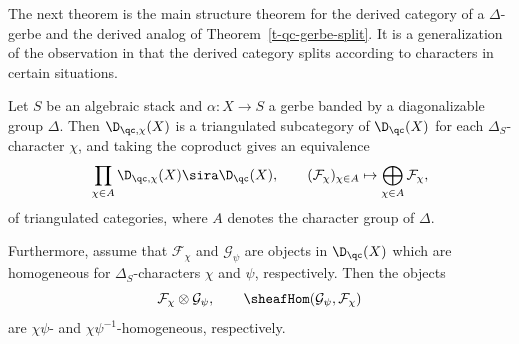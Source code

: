The next theorem is the main structure theorem for the derived
category of a $\Delta$-gerbe and the derived analog of Theorem~\ref{t-qc-gerbe-split}.
It is a generalization of the observation in \cite[Section~2.2.4]{lieblich2004}
that the derived category splits according to characters in certain situations.
\begin{theorem}
  \label{t:chi-splitting-D-qc-X}
  Let $S$ be an algebraic stack and 
  $\alpha\colon X \to S$ a gerbe banded by a diagonalizable group
  $\Delta$.
  Then $\D_{\qc, \chi}(X)$ is
  a triangulated subcategory of $\D_{\qc}(X)$ for each $\Delta_S$-character $\chi$,
  and taking the coproduct gives an equivalence
\begin{equation}
\label{eq-equivalence-derived}
\prod_{\chi \in A} \D_{\qc, \chi}(X) \sira \D_\qc(X),
\qquad
 (\mathcal{F}_\chi)_{\chi \in A} 
\mapsto 
\bigoplus_{\chi \in A} \mathcal{F}_\chi,
\end{equation}
of triangulated categories, where $A$ denotes the character group of $\Delta$.

Furthermore, assume that $\mathcal{F}_\chi$ and $\mathcal{G}_\psi$ are objects in $\D_\qc(X)$
which are homogeneous for $\Delta_S$-characters $\chi$ and $\psi$, respectively.
Then the objects
\begin{equation}
\label{eq-der-monoidal}
\mathcal{F}_\chi \otimes \mathcal{G}_\psi, \qquad
\sheafHom(\mathcal{G}_\psi, \mathcal{F}_\chi)
\end{equation}
are $\chi\psi$- and $\chi\psi^{-1}$-homogeneous, respectively.
\end{theorem}

